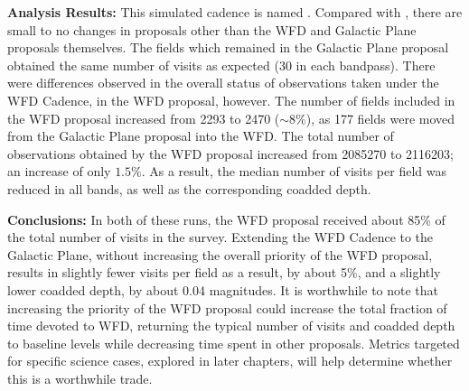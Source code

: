  {\bf Analysis Results:}  This simulated cadence is named
 . Compared with
 , there are small to no changes in
 proposals other than the WFD and Galactic Plane proposals
 themselves. The fields which remained in the Galactic Plane proposal
 obtained the same number of visits as expected (30 in each
 bandpass). There were differences observed in the overall status of
 observations taken under the WFD Cadence, in the WFD proposal,
 however. The number of fields included in the WFD proposal increased
 from 2293 to 2470 ($\sim8\%$), as 177 fields were moved from the Galactic Plane
 proposal into the WFD. The total number of observations obtained by
 the WFD proposal increased from 2085270 to 2116203; an increase of
 only $1.5\%$. As a result, the median number of visits per field was
 reduced in all bands, as well as the corresponding coadded depth.

{\bf Conclusions:} In both of these runs, the WFD proposal received
about 85\% of the total number of visits in the survey. Extending the
WFD Cadence to the Galactic Plane, without increasing the
overall priority of the WFD proposal, results in slightly fewer
visits per field as a result, by about 5\%, and a slightly lower
coadded depth, by about 0.04 magnitudes. It is worthwhile to note that
increasing the priority of the WFD proposal could increase the total
fraction of time devoted to WFD, returning the typical number of
visits and coadded depth to baseline levels while decreasing time
spent in other proposals. Metrics targeted for specific science cases,
explored in later chapters, will help determine whether this is a
worthwhile trade.

\navigationbar





